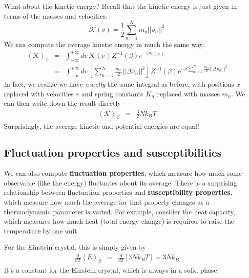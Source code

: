 \documentclass[english,course]{lecture}
\begin{document}
What about the kinetic energy?
Recall that the kinetic energy is just given in terms of the masses and velocities:
\begin{equation}
\mathcal{K}(v) = \frac{1}{2} \sum_{n=1}^N m_n ||v_n||^2
\end{equation}
We can compute the average kinetic energy in much the same way:
\begin{eqnarray}
\left< \mathcal{K} \right>_\beta &=& \int_{-\infty}^{+\infty} dv \, \mathcal{K}(v) \, Z^{-1}(\beta) e^{-\beta \mathcal{K}(x)} \\
&=& \int_{-\infty}^{+\infty} dv \, \left[ \sum_{n=1}^N \frac{m_n}{2} ||\Delta v_n||^2 \right] \, Z^{-1}(\beta) e^{-\beta \sum_{n'=1}^N \frac{m_{n'}}{2} ||\Delta v_{n'}||^2}
\end{eqnarray}
In fact, we realize we have \emph{exactly} the same integral as before, with positions $x$ replaced with velocities $v$ and spring constants $K_n$ replaced with masses $m_n$.
We can then write down the result directly
\begin{eqnarray}
\left< \mathcal{K} \right>_\beta &=& \frac{3}{2} N k_B T
\end{eqnarray}
Surprisingly, the average kinetic and potential energies are equal!

\subsection{Fluctuation properties and susceptibilities}

We can also compute {\bf fluctuation properties}, which measure how much some observable (like the energy) fluctuates about its average.
There is a surprising relationship between fluctuation properties and {\bf susceptibility properties}, which measure how much the average for that property changes as a thermodynamic parameter is varied.
For example, consider the heat capacity, which measures how much heat (total energy change) is required to raise the temperature by one unit.

For the Einstein crystal, this is simply given by
\begin{eqnarray}
\frac{d}{dT} \left<E\right>_\beta &=& \frac{d}{dT} [ 3 N k_B T ] = 3 N k_B
\end{eqnarray}
It's a constant for the Einstein crystal, which is always in a solid phase.
\end{document}
